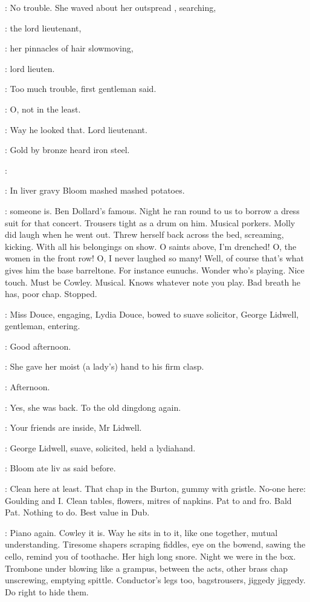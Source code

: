 :
No trouble.
She waved about her outspread ,
searching,

\MissKInt:
the lord lieutenant,

:
her pinnacles of hair slowmoving,

\MissKInt:
lord lieuten.

:
Too much trouble,
first gentleman said.

:
O, not in the least.

\MissKInt:
Way he looked that.
Lord lieutenant.

:
Gold by bronze
heard iron steel.%

\dollard:

:
In liver gravy Bloom mashed mashed potatoes.

\BloomInt:
 someone is.
Ben Dollard's famous.
Night he ran round to us
to borrow a dress suit for that concert.
Trousers tight as a drum on him.
Musical porkers.
Molly did laugh when he went out.
Threw herself back across the bed,
screaming,
kicking.
With all his belongings on show.
O saints above,
I'm drenched!
O, the women in the front row!
O, I never laughed so many!
Well,
of course that's what gives him the base barreltone.
For instance eunuchs.
Wonder who's playing.
Nice touch.
Must be Cowley.
Musical.
Knows whatever note you play.
Bad breath he has,
poor chap.
Stopped.

:
Miss Douce,
engaging,
Lydia Douce,
bowed to suave solicitor,
George Lidwell,
gentleman,
entering.

\lidwell:
Good afternoon.

:
She gave her moist (a lady's) hand to his firm clasp.

\MissD:
Afternoon.

:
Yes,
she was back.
To the old dingdong again.

\MissD:
Your friends are inside,
Mr Lidwell.

:
George Lidwell,
suave,
solicited,
held a lydiahand.

:
Bloom ate liv as said before.

\BloomInt:
Clean here at least.
That chap in the Burton,
gummy with gristle.
No-one here:
Goulding and I.
Clean tables,
flowers,
mitres of napkins.
Pat to and fro.
Bald Pat.
Nothing to do.
Best value in Dub.

\BloomInt:
Piano again.
Cowley it is.
Way he sits in to it,
like one together,
mutual understanding.
Tiresome shapers scraping fiddles,
eye on the bowend,
sawing the cello,
remind you of toothache.
Her high long snore.
Night we were in the box.
Trombone under blowing like a grampus,
between the acts,
other brass chap unscrewing,
emptying spittle.
Conductor's legs too,
bagstrousers,
jiggedy jiggedy.
Do right to hide them.

